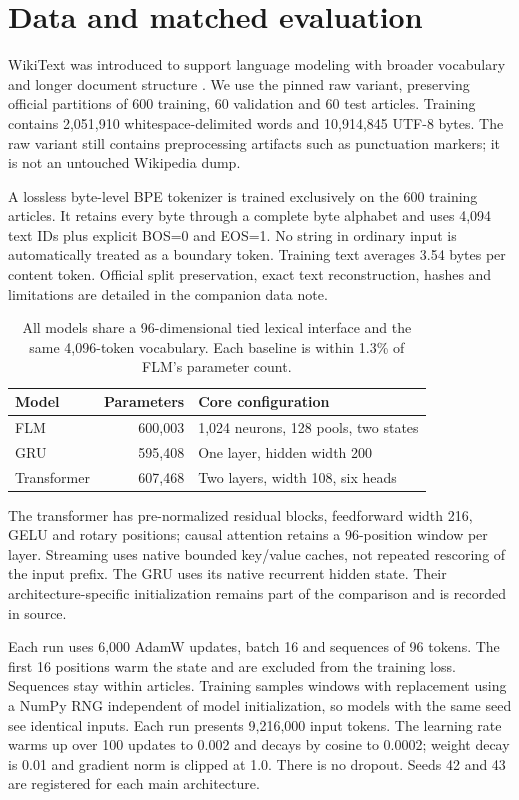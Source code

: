\documentclass[10pt]{article}
\begin{document}
\section{Data and matched evaluation}
WikiText was introduced to support language modeling with broader vocabulary and longer document structure \cite{wikitext}. We use the pinned raw variant, preserving official partitions of 600 training, 60 validation and 60 test articles. Training contains 2,051,910 whitespace-delimited words and 10,914,845 UTF-8 bytes. The raw variant still contains preprocessing artifacts such as punctuation markers; it is not an untouched Wikipedia dump.

A lossless byte-level BPE tokenizer is trained exclusively on the 600 training articles. It retains every byte through a complete byte alphabet and uses 4,094 text IDs plus explicit BOS=0 and EOS=1. No string in ordinary input is automatically treated as a boundary token. Training text averages 3.54 bytes per content token. Official split preservation, exact text reconstruction, hashes and limitations are detailed in the companion data note.

\begin{table}[ht]\centering
\begin{tabular}{lrl}\toprule
Model & Parameters & Core configuration\\\midrule
FLM & 600,003 & 1,024 neurons, 128 pools, two states\\
GRU & 595,408 & One layer, hidden width 200\\
Transformer & 607,468 & Two layers, width 108, six heads\\\bottomrule
\end{tabular}
\caption{All models share a 96-dimensional tied lexical interface and the same 4,096-token vocabulary. Each baseline is within 1.3\% of FLM's parameter count.}
\end{table}

The transformer has pre-normalized residual blocks, feedforward width 216, GELU and rotary positions; causal attention retains a 96-position window per layer. Streaming uses native bounded key/value caches, not repeated rescoring of the input prefix. The GRU uses its native recurrent hidden state. Their architecture-specific initialization remains part of the comparison and is recorded in source.

Each run uses 6,000 AdamW updates, batch 16 and sequences of 96 tokens. The first 16 positions warm the state and are excluded from the training loss. Sequences stay within articles. Training samples windows with replacement using a NumPy RNG independent of model initialization, so models with the same seed see identical inputs. Each run presents 9,216,000 input tokens. The learning rate warms up over 100 updates to 0.002 and decays by cosine to 0.0002; weight decay is 0.01 and gradient norm is clipped at 1.0. There is no dropout. Seeds 42 and 43 are registered for each main architecture.
\end{document}
